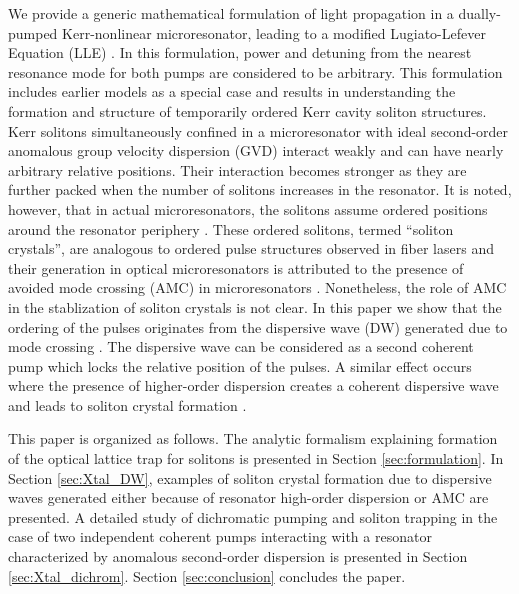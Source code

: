 We provide a generic mathematical formulation of light propagation in a dually-pumped Kerr-nonlinear microresonator, leading to a modified Lugiato-Lefever Equation (LLE) \cite{lugiato1987spatial}. In this formulation, power and detuning from the nearest resonance mode for both pumps are considered to be arbitrary. This formulation includes earlier models \cite{hansson2014bichromatically, okawachi2015dual} as a special case and results in understanding the formation and structure of temporarily ordered Kerr cavity soliton structures. Kerr solitons simultaneously confined in a microresonator with ideal second-order anomalous group velocity dispersion (GVD) interact weakly and can have nearly arbitrary relative positions. Their interaction becomes stronger as they are further packed when the number of solitons increases in the resonator. It is noted, however, that in actual microresonators, the solitons assume ordered positions around the resonator periphery \cite{lamb16stabilizing}. These ordered solitons, termed ``soliton crystals'', are analogous to ordered pulse structures observed in fiber lasers \cite{Amrani2010matter, Amrani2011crystals} and their generation in optical microresonators is attributed to the presence of avoided mode crossing (AMC) in microresonators \cite{savchenkov2012overmoded, herr2014mode}. Nonetheless, the role of AMC in the stablization of soliton crystals is not clear. In this paper we show that the ordering of the pulses originates from the dispersive wave (DW) generated due to  mode crossing \cite{matsko2016cherenkov}. The dispersive wave can be considered as a second coherent pump which locks the relative position of the pulses. A similar effect occurs where the presence of higher-order dispersion creates a coherent dispersive wave and leads to soliton crystal formation \cite{wang2014hod, milian2014soliton, taheri2016highorderdisp}.

This paper is organized as follows. The analytic formalism explaining formation of the optical lattice trap for solitons is presented in Section \ref{sec:formulation}. In Section \ref{sec:Xtal_DW}, examples of soliton crystal formation due to dispersive waves generated either because of resonator high-order dispersion or AMC are presented. A detailed study of dichromatic pumping and soliton trapping in the case of two independent coherent pumps interacting with a resonator characterized by anomalous second-order dispersion is presented in Section \ref{sec:Xtal_dichrom}. Section \ref{sec:conclusion} concludes the paper.

